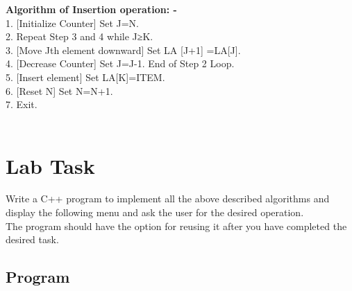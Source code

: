 \documentclass[11pt]{article}            %
\begin{document}
\textbf{Algorithm of Insertion operation: -}\\
1. [Initialize Counter] Set J=N.\\   2. Repeat Step 3 and 4 while J≥K.\\   3. [Move Jth element downward] Set LA [J+1] =LA[J].\\   4. [Decrease Counter] Set J=J-1.   End of Step 2 Loop.\\  5. [Insert element] Set LA[K]=ITEM.\\   6. [Reset N] Set N=N+1. \\  7. Exit.\\ \\ 

\section{Lab Task }  
Write a C++ program to implement all the above described algorithms and display the following menu and ask the user for the desired operation.\\    The program should have the option for reusing it after you have completed the desired task.




\subsection{Program}     
\end{document}
